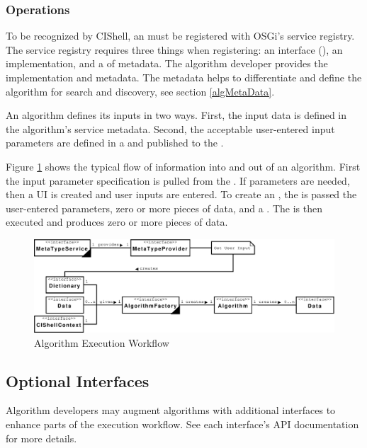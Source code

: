 \subsubsection{Operations}

To be recognized by CIShell, an  must be registered with
OSGi's service registry. The service registry requires three things when
registering: an interface (), an implementation, and a
 of metadata. The algorithm developer provides the
implementation and metadata. The metadata helps to differentiate and define the
algorithm for search and discovery, see section \ref{algMetaData}.

An algorithm defines its inputs in two ways. First, the input data is defined in
the algorithm's service metadata. Second, the acceptable user-entered
input parameters are defined in a  and published to the
.

Figure \ref{fig:algExecWorkflow} shows the typical flow of information into and
out of an algorithm. First the input parameter specification is pulled from the
. If parameters are needed, then a UI is created and
user inputs are entered. To create an , the
 is passed the user-entered parameters, zero or more
pieces of data, and a . The  is then
executed and produces zero or more pieces of data.

\begin{figure}[htb!]
\centering
\includegraphics[width=150mm]{../img/algExecWorkflow.pdf}
\caption{Algorithm Execution Workflow}
\label{fig:algExecWorkflow}
\end{figure}


\subsection{Optional Interfaces}

Algorithm developers may augment algorithms with additional interfaces to enhance
parts of the execution workflow. See each interface's API documentation for more
details.


